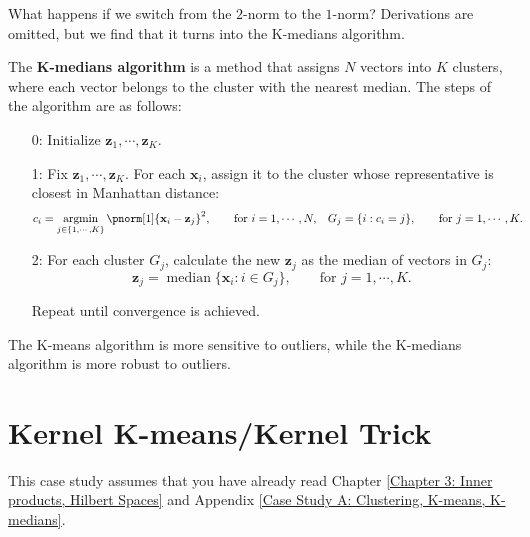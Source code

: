\documentclass{huhtakm-template-book-v2}
\DeclareMathOperator*{\argmin}{argmin}
\DeclareMathOperator*{\median}{median}
\begin{document}
    What happens if we switch from the $2$-norm to the $1$-norm? Derivations are omitted, but we find that it turns into the K-medians algorithm.
    \begin{defn}
        The \textbf{K-medians algorithm} is a method that assigns $N$ vectors into $K$ clusters, where each vector belongs to the cluster with the nearest median. The steps of the algorithm are as follows:
        \begin{itemize}
            \item[0:] Initialize $\mathbf{z}_{1}, \cdots, \mathbf{z}_{K}$.
            \item[1:] Fix $\mathbf{z}_{1}, \cdots, \mathbf{z}_{K}$. For each $\mathbf{x}_{i}$, assign it to the cluster whose representative is closest in Manhattan distance:
            \begin{align*}
                c_{i} &= \argmin_{j \in \{1, \cdots, K\}}\pnorm[1]{\mathbf{x}_{i} - \mathbf{z}_{j}}^{2}, \qquad \text{for } i = 1, \cdots, N, & G_{j} &= \{i : c_{i} = j\}, \qquad \text{for } j = 1, \cdots, K.
            \end{align*}
            \item[2:] For each cluster $G_{j}$, calculate the new $\mathbf{z}_{j}$ as the median of vectors in $G_{j}$:
            \begin{equation*}
                \mathbf{z}_{j} = \median\{\mathbf{x}_{i} : i \in G_{j}\}, \qquad \text{for } j = 1, \cdots, K.
            \end{equation*}
            \item[] Repeat until convergence is achieved.
        \end{itemize}
    \end{defn}
    \begin{rem}
        The K-means algorithm is more sensitive to outliers, while the K-medians algorithm is more robust to outliers.
    \end{rem}

\chapter{Kernel K-means/Kernel Trick}
    \label{Case Study B: Kernel K-means/Kernel Trick}
    This case study assumes that you have already read Chapter \ref{Chapter 3: Inner products, Hilbert Spaces} and Appendix \ref{Case Study A: Clustering, K-means, K-medians}.
\end{document}
